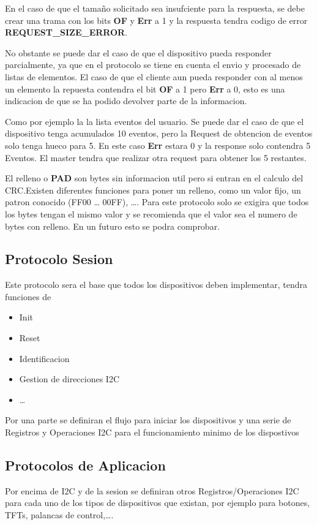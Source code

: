 En el caso de que el tamaño solicitado sea insufciente para la respuesta, se debe crear una trama con los bits \textbf{OF} y \textbf{Err}
a 1 y la respuesta tendra codigo de error \textbf{REQUEST\_SIZE\_ERROR}.

No obstante se puede dar el caso de que el dispositivo pueda responder parcialmente, ya que en el protocolo se tiene en cuenta el envio
y procesado de listas de elementos. El caso de que el cliente aun pueda responder con al menos un elemento la repuesta contendra el bit
\textbf{OF} a 1 pero \textbf{Err} a 0, esto es una indicacion de que se ha podido devolver parte de la informacion.

Como por ejemplo la la lista eventos del usuario. Se puede dar el caso de que el dispositivo tenga acumulados 10 eventos, pero la Request
de obtencion de eventos solo tenga hueco para 5. En este caso \textbf{Err} estara 0 y la response solo contendra 5 Eventos. El master
tendra que realizar otra request para obtener los 5 restantes.

El relleno o \textbf{PAD} son bytes sin informacion util pero si entran en el calculo del CRC.\@ Existen diferentes funciones para poner
un relleno, como un valor fijo, un patron conocido (FF00 \dots{} 00FF), \dots{}. Para este protocolo solo se exigira que todos los bytes
tengan el mismo valor y se recomienda que el valor sea el numero de bytes con relleno. En un futuro esto se podra comprobar.

\subsection{Protocolo Sesion}
Este protocolo sera el base que todos los dispositivos deben implementar, tendra funciones de
\begin{itemize}
    \item{} Init
    \item{} Reset
    \item{} Identificacion
    \item{} Gestion de direcciones I2C
    \item{} \dots{}
\end{itemize}

Por una parte se definiran el flujo para iniciar los dispositivos y una serie de Registros y Operaciones I2C para
el funcionamiento minimo de los dispostivos

\subsection{Protocolos de Aplicacion}

Por encima de I2C y de la sesion se definiran otros Registros/Operaciones I2C para cada uno de los tipos de
dispositivos que existan,  por ejemplo para botones, TFTs, palancas de control,\dots.
